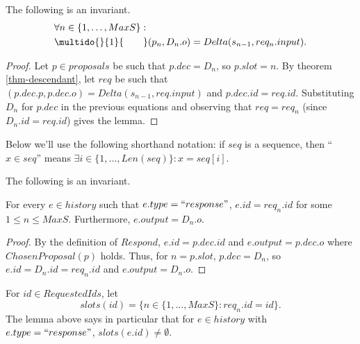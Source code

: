 \documentclass[12pt,a4paper,en]{pracamgr}
\newcommand{\ind}[1]{\multido{}{#1}{\qquad}}
\begin{document}
\begin{lemma}\label{delta}
    The following is an invariant.
    \begin{align*}
        & \forall n \in \{1, \dots, MaxS\}:\\
        & \ind{1} (p_n, D_n.o) = Delta(s_{n-1}, req_n.input).
    \end{align*}
\end{lemma}
\begin{proof}
    Let $p \in proposals$ be such that $p.dec = D_n$, so $p.slot = n$. By theorem \ref{thm-descendant}, let $req$ be such that $(p.dec.p, p.dec.o) = Delta(s_{n-1}, req.input)$ and $p.dec.id = req.id$. Substituting $D_n$ for $p.dec$ in the previous equations and observing that $req = req_n$ (since $D_n.id = req.id$) gives the lemma.
\end{proof}

Below we'll use the following shorthand notation: if $seq$ is a sequence, then ``$x \in seq$'' means $\exists i \in \{1, \dots, Len(seq)\}: x = seq[i]$.

\begin{lemma}\label{resp-has-req}
    The following is an invariant.

    For every $e \in history$ such that $e.type = ``response"$, $e.id = req_n.id$ for some $1 \le n \le MaxS$. Furthermore, $e.output = D_n.o$.
\end{lemma}
\begin{proof}
    By the definition of $Respond$, $e.id = p.dec.id$ and $e.output = p.dec.o$ where $ChosenProposal(p)$ holds. Thus, for $n = p.slot$, $p.dec = D_n$, so $e.id = D_n.id = req_n.id$ and $e.output = D_n.o$.
\end{proof}

For $id \in RequestedIds$, let
$$ slots(id) = \{n \in \{1, \dots, MaxS\}: req_n.id = id\}. $$
The lemma above says in particular that for $e \in history$ with $e.type = ``response"$, $slots(e.id) \neq \emptyset$.
\end{document}
